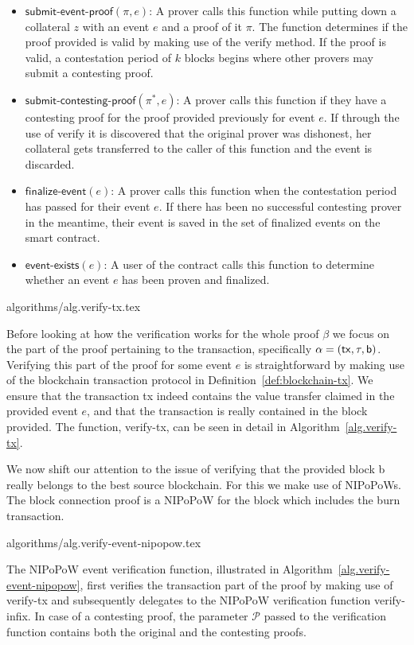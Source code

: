 \begin{itemize}
  \item $\textsf{submit-event-proof}(\pi, e)$: A prover calls this function while putting down a collateral $z$ with an event $e$ and a proof of it $\pi$. The function determines if the proof provided is valid by making use of the \textsf{verify} method. If the proof is valid, a contestation period of $k$ blocks begins where other provers may submit a contesting proof.
  \item $\textsf{submit-contesting-proof}(\pi^*, e)$: A prover calls this function if they have a contesting proof for the proof provided previously for event $e$. If through the use of \textsf{verify} it is discovered that the original prover was dishonest, her collateral gets transferred to the caller of this function and the event is discarded.
  \item $\textsf{finalize-event}(e)$: A prover calls this function when the contestation period has passed for their event $e$. If there has been no successful contesting prover in the meantime, their event is saved in the set of finalized events on the smart contract.
  \item $\textsf{event-exists}(e)$: A user of the contract calls this function to determine whether an event $e$ has been proven and finalized.
\end{itemize}

{algorithms/alg.verify-tx.tex}

Before looking at how the verification works for the whole proof $\beta$ we focus on the part of the proof pertaining to the transaction, specifically $\alpha = \sf(tx, \tau, b)$. Verifying this part of the proof for some event $e$ is straightforward by making use of the blockchain transaction protocol in Definition~\ref{def:blockchain-tx}. We ensure that the transaction \textsf{tx} indeed contains the value transfer claimed in the provided event $e$, and that the transaction is really contained in the block provided. The function, \textsf{verify-tx}, can be seen in detail in Algorithm~\ref{alg.verify-tx}.

We now shift our attention to the issue of verifying that the provided block \textsf{b} really belongs to the best source blockchain. For this we make use of NIPoPoWs. The block connection proof is a NIPoPoW for the block which includes the burn transaction.

{algorithms/alg.verify-event-nipopow.tex}

The NIPoPoW event verification function, illustrated in Algorithm~\ref{alg.verify-event-nipopow}, first verifies the transaction part of the proof by making use of \textsf{verify-tx} and subsequently delegates to the NIPoPoW verification function \textsf{verify-infix}. In case of a contesting proof, the parameter $\mathcal{P}$ passed to the verification function contains both the original and the contesting proofs.

